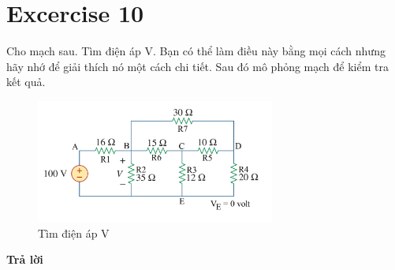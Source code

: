 \section{Excercise 10}
Cho mạch sau. Tìm điện áp V. Bạn có thể làm điều này bằng mọi cách nhưng hãy nhớ
để giải thích nó một cách chi tiết. Sau đó mô phỏng mạch để kiểm tra kết quả.\\
\begin{figure}[!htbp]
    \centering
    \includegraphics[width=0.7\textwidth]{graphics/ex10/f1.png}
    \caption{Tìm điện áp V}
\end{figure}
\textbf{Trả lời}\\
